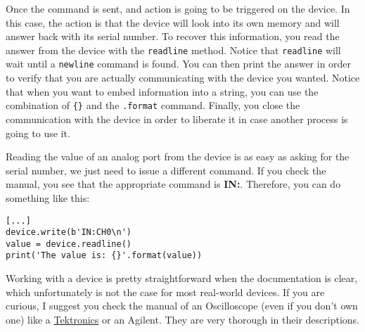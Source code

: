 Once the command is sent, and action is going to be triggered on the
device. In this case, the action is that the device will look into its
own memory and will answer back with its serial number. To recover this
information, you read the answer from the device with the
\texttt{readline} method. Notice that \texttt{readline} will wait until
a \texttt{newline} command is found. You can then print the answer in
order to verify that you are actually communicating with the device you
wanted. Notice that when you want to embed information into a string,
you can use the combination of \texttt{\{\}} and the \texttt{.format}
command. Finally, you close the communication with the device in order
to liberate it in case another process is going to use it.



Reading the value of an analog port from the device is as easy as asking
for the serial number, we just need to issue a different command. If you
check the manual, you see that the appropriate command is
\textbf{{IN}:}. Therefore, you can do something like this:

\begin{verbatim}
[...]
device.write(b'IN:CH0\n')
value = device.readline()
print('The value is: {}'.format(value))
\end{verbatim}

Working with a device is pretty straightforward when the documentation
is clear, which unfortunately is not the case for most real-world
devices. If you are curious, I suggest you check the manual of an
Oscilloscope (even if you don't own one) like a
\href{https://www.tek.com/oscilloscope/tds1000-manual}{Tektronics} or an
Agilent. They are very thorough in their descriptions.



